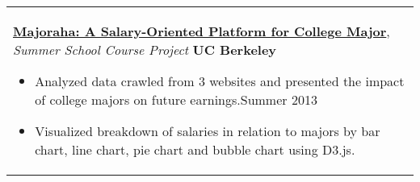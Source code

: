 \documentclass[a4paper,10pt]{article} %
\begin{document}
{\begin{tabular}{p{18.5cm}}
{\fontsize{11}{13.2}\textbf{\href{http://people.ischool.berkeley.edu/~charleswang/i153/final/facetBrowser/index.html}{Majoraha: A Salary-Oriented Platform for College Major}}}, {\it{Summer School Course Project}} \hfill \textbf{UC Berkeley} 
\vspace{0.5mm}
\begin{itemize}
\item Analyzed data crawled from 3 websites and presented the impact of college majors on future earnings.\hfill Summer 2013
\item Visualized breakdown of salaries in relation to majors by bar chart, line chart, pie chart and bubble chart using D3.js. \vspace*{-\baselineskip}
\end{itemize}\\

%
\end{tabular}

}
\end{document}
